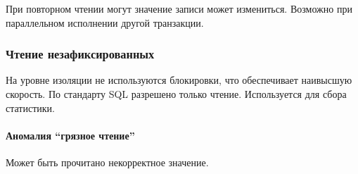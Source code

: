 При повторном чтении могут значение записи может измениться. Возможно при параллельном исполнении
другой транзакции.

\subsubsection{Чтение незафиксированных}

На уровне изоляции не используются блокировки, что обеспечивает наивысшую скорость. По стандарту SQL разрешено только чтение. Используется для сбора статистики.

\paragraph{Аномалия ``грязное чтение''}

Может быть прочитано некорректное значение.
